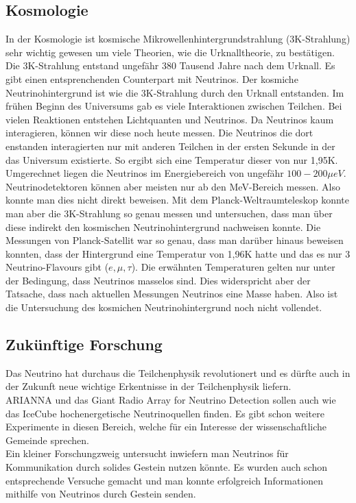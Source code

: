 \subsection{Kosmologie}

In der Kosmologie ist kosmische Mikrowellenhintergrundstrahlung (3K-Strahlung) sehr wichtig gewesen um viele
Theorien, wie die Urknalltheorie, zu bestätigen. Die 3K-Strahlung entstand ungefähr 380 Tausend Jahre nach dem
Urknall. Es gibt einen entsprenchenden Counterpart mit Neutrinos. Der kosmiche Neutrinohintergrund ist wie die 3K-Strahlung
durch den Urknall entstanden.
Im frühen Beginn des Universums gab es viele Interaktionen zwischen Teilchen. Bei vielen Reaktionen entstehen Lichtquanten
und Neutrinos. Da Neutrinos kaum interagieren, können wir diese noch heute messen.
Die Neutrinos die dort enstanden interagierten nur mit anderen Teilchen in der ersten Sekunde in der das Universum
existierte. So ergibt sich eine Temperatur dieser von nur 1,95K. Umgerechnet liegen die Neutrinos im Energiebereich
von ungefähr $100-200 \mu eV$. Neutrinodetektoren können aber meisten nur ab den MeV-Bereich messen. Also
konnte man dies nicht direkt beweisen. Mit dem Planck-Weltraumteleskop konnte man aber die 3K-Strahlung so genau
messen und untersuchen, dass man über diese indirekt den kosmischen Neutrinohintergrund nachweisen konnte.
Die Messungen von Planck-Satellit war so genau, dass man darüber hinaus beweisen konnten, dass der Hintergrund eine
Temperatur von 1,96K hatte und das es nur 3 Neutrino-Flavours gibt ($e,\mu,\tau$). Die erwähnten Temperaturen
gelten nur unter der Bedingung, dass Neutrinos masselos sind. \cite{Siegel2016} Dies widerspricht aber der Tatsache,
dass nach aktuellen Messungen Neutrinos eine Masse haben. Also ist die Untersuchung des kosmichen Neutrinohintergrund
noch nicht vollendet.

\subsection{Zukünftige Forschung}

Das Neutrino hat durchaus die Teilchenphysik revolutionert und es dürfte auch in der Zukunft neue wichtige
Erkentnisse in der Teilchenphysik liefern. \\
ARIANNA und das Giant Radio Array for Neutrino Detection sollen auch wie das IceCube hochenergetische Neutrinoquellen
finden. Es gibt schon weitere Experimente in diesen Bereich, welche für ein Interesse der wissenschaftliche Gemeinde sprechen. \\
Ein kleiner Forschungzweig untersucht inwiefern man Neutrinos für Kommunikation durch solides Gestein nutzen könnte.
Es wurden auch schon entsprechende Versuche gemacht und man konnte erfolgreich Informationen mithilfe von Neutrinos durch
Gestein senden.

